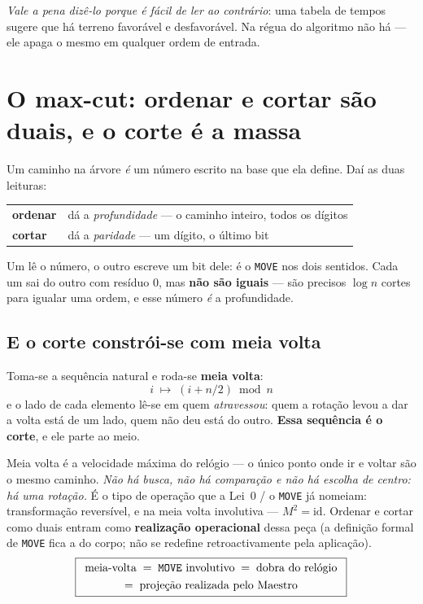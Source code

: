\documentclass[11pt,a4paper]{article}
\newcommand{\code}[1]{\texttt{\small #1}}
\begin{document}
\smallskip
\noindent \emph{Vale a pena dizê-lo porque é fácil de ler ao contrário}: uma tabela de tempos
sugere que há terreno favorável e desfavorável. Na régua do algoritmo não há --- ele apaga o mesmo
em qualquer ordem de entrada.

\section{O max-cut: ordenar e cortar são duais, e o corte é a massa}\label{sec:cortar}

Um caminho na árvore \emph{é} um número escrito na base que ela define. Daí as duas leituras:

\begin{center}\small
\begin{tabular}{@{}ll@{}}
\toprule
\textbf{ordenar} & dá a \emph{profundidade} --- o caminho inteiro, todos os dígitos \\
\textbf{cortar} & dá a \emph{paridade} --- um dígito, o último bit \\
\bottomrule
\end{tabular}
\end{center}

\noindent Um lê o número, o outro escreve um bit dele: é o \code{MOVE} nos dois sentidos. Cada um sai
do outro com resíduo $0$, mas \textbf{não são iguais} --- são precisos $\log n$ cortes para igualar
uma ordem, e esse número \emph{é} a profundidade.

\subsection*{E o corte constrói-se com meia volta}

Toma-se a sequência natural e roda-se \textbf{meia volta}:
\[
  \boxed{\;i \;\longmapsto\; (i + n/2) \bmod n\;}
\]
e o lado de cada elemento lê-se em quem \emph{atravessou}: quem a rotação levou a dar a volta está de
um lado, quem não deu está do outro. \textbf{Essa sequência é o corte}, e ele parte ao meio.

\smallskip
\noindent Meia volta é a velocidade máxima do relógio --- o único ponto onde ir e voltar são o mesmo
caminho. \emph{Não há busca, não há comparação e não há escolha de centro: há uma rotação.} É o
tipo de operação que a Lei~$0$ / o \code{MOVE} já nomeiam: transformação reversível, e na meia volta
involutiva --- $M^{2}=\mathrm{id}$. Ordenar e cortar como duais entram como \textbf{realização
operacional} dessa peça (a definição formal de \code{MOVE} fica a do corpo; não se redefine
retroactivamente pela aplicação).
\[
\boxed{
\begin{array}{c}
\text{meia-volta}
\;=\;
\text{\texttt{MOVE} involutivo}
\;=\;
\text{dobra do relógio}
\\[0.35em]
=\;
\text{projeção realizada pelo Maestro}
\end{array}
}
\]
\end{document}
